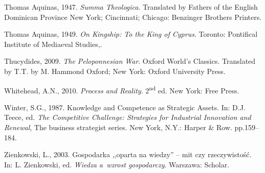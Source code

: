 Thomas Aquinas, 1947. \textit{Summa Theologica}. Translated by Fathers of the English Dominican Province New York; Cincinnati; Chicago: Benzinger Brothers Printers.



Thomas Aquinas, 1949. \textit{On Kingship: To the King of Cyprus}. Toronto: Pontifical Institute of Mediaeval Studies,.



Thucydides, 2009. \textit{The Peloponnesian War}. Oxford World's Classics. Translated by T.T. by M. Hammond Oxford; New York: Oxford University Press.



Whitehead, A.N., 2010. \textit{Process and Reality}. 2\textsuperscript{nd} ed. New York: Free Press.



Winter, S.G., 1987. Knowledge and Competence as Strategic Assets. In: D.J. Teece, ed. \textit{The Competitive Challenge: Strategies for Industrial Innovation and Renewal}, The business strategist series. New York, N.Y.: Harper \& Row. pp.159–184.



Zienkowski, L., 2003. Gospodarka ,,oparta na wiedzy'' -- mit czy rzeczywistość. In: L. Zienkowski, ed. \textit{Wiedza a~wzrost gospodarczy}. Warszawa: Scholar.



